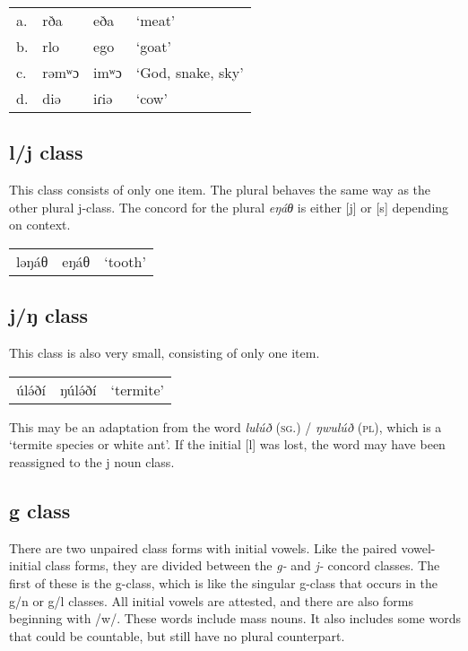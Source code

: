 \ea
\begin{tabular}[t]{llll}
a.	&	rða		&	eða		&	‘meat’\\
b.	&	rlo		&	ego		&	‘goat’\\
c.	&	rəmʷɔ	&	imʷɔ	&	‘God, snake, sky’\\
d.	&	diə		&	iɾiə	&	‘cow’\\
\end{tabular}
\z

\subsection{l/j class}
This class consists of only one item. The plural behaves the same way as the other plural j-class. The concord for the plural \textit{eŋáθ} is either [j] or [s] depending on context. 

\ea	 
\begin{tabular}[t]{lll}
ləŋáθ	&	eŋáθ	&	‘tooth’ \\
\end{tabular}
\z 


\subsection{j/ŋ class}
This class is also very small, consisting of only one item. 

\ea	 
\begin{tabular}[t]{lll}
úlə́ðí	&	ŋúlə́ðí	&	‘termite’\\
\end{tabular}
\z 

This may be an adaptation from the word \textit{lulúð} (\textsc{sg}.) / \textit{ŋwulúð} (\textsc{pl}), which is a ‘termite species or white ant’. If the initial [l] was lost, the word may have been reassigned to the j noun class. 


\subsection{g class}
There are two unpaired class forms with initial vowels. Like the paired vowel-initial class forms, they are divided between the \textit{g-} and \textit{j-} concord classes. The first of these is the g-class, which is like the singular g-class that occurs in the g/n or g/l classes. All initial vowels are attested, and there are also forms beginning with /w/. These words include mass nouns. It also includes some words that could be countable, but still have no plural counterpart. 

